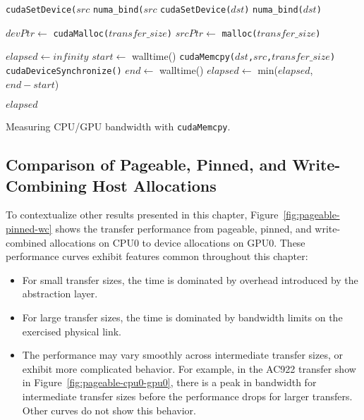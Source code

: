 \begin{algorithm}[H]
	\begin{algorithmic}[1]
		\Statex
		\State \texttt{cudaSetDevice($src$}
		\Else {}
		\State \texttt{numa\_bind($src$}
		\EndIf
		\State \texttt{cudaSetDevice($dst$)}
		\Else {}
		\State \texttt{numa\_bind($dst$)}
		\EndIf
		
		\State $devPtr \gets$ \texttt{cudaMalloc($transfer\_size$)} 
		\State $srcPtr \gets$ \texttt{malloc($transfer\_size$)} 
		
		\State $elapsed \gets infinity$ 
		\State $start \gets$ walltime()
		\State \texttt{cudaMemcpy($dst$,$src$,$transfer\_size$)}
		\State \texttt{cudaDeviceSynchronize()}
		\State $end \gets$ walltime()
		\State $elapsed \gets$ min($elapsed$, $end-start$)
		\EndFor
		
		\Return $elapsed$
		\EndFunction
		
	\end{algorithmic}
	\caption[Measuring CPU/GPU bandwidth with \texttt{cudaMemcpy}]{
        Measuring CPU/GPU bandwidth with \texttt{cudaMemcpy}.
	}
	\label{alg:explicit-cpu-gpu}
\end{algorithm}

\subsection{Comparison of Pageable, Pinned, and Write-Combining Host Allocations}
\label{sec:explicit-pageable-pinned-wc}

To contextualize other results presented in this chapter, Figure~\ref{fig:pageable-pinned-wc} shows the transfer performance from pageable, pinned, and write-combined allocations on CPU0 to device allocations on GPU0.
These performance curves exhibit features common throughout this chapter:
\begin{itemize}
	\item For small transfer sizes, the time is dominated by overhead introduced by the abstraction layer.
	\item For large transfer sizes, the time is dominated by bandwidth limits on the exercised physical link.
	\item The performance may vary smoothly across intermediate transfer sizes, or exhibit more complicated behavior.
	For example, in the AC922 transfer show in Figure~\ref{fig:pageable-cpu0-gpu0}, there is a peak in bandwidth for intermediate transfer sizes before the performance drops for larger transfers.
	Other curves do not show this behavior.
\end{itemize}

